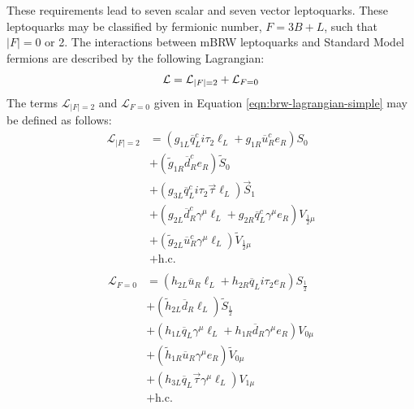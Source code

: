 These requirements lead to seven scalar and seven vector leptoquarks.
These leptoquarks may be classified by fermionic number, $F = 3B + L$, such that $|F| = 0$ or 2.
The interactions between mBRW leptoquarks and Standard Model fermions 
are described by the following Lagrangian:
\begin{equation}
  \mathcal{L} = \mathcal{L}_{|F|=2} + \mathcal{L}_{F=0} \\
  \label{eqn:brw-lagrangian-simple}
\end{equation}
\noindent The terms $\mathcal{L}_{|F|=2}$ and $\mathcal{L}_{F=0}$ given in 
Equation \ref{eqn:brw-lagrangian-simple} may be defined as follows:
\begin{equation}
  \begin{aligned}
    \mathcal{L}_{|F|=2} 
    &= ( g_{1L} \overline{q}_{L}^{c} i \tau_2 \ell_{L} + g_{1R}\overline{u}_{R}^{c} e_{R}) S_{0} \\
    &+ ( \tilde{g}_{1R} \overline{d}^{c}_{R} e_{R} ) \tilde{S}_{0} \\
    &+ ( g_{3L} \overline{q}_{L}^{c} i \tau_2 \vec{\tau} \ell_{L} ) \vec{S}_{1} \\
    &+ ( g_{2L} \overline{d}_{R}^{c} \gamma ^{\mu} \ell_{L} + g_{2R} \overline{q}_{L}^{c} \gamma^{\mu} e_{R} ) V_{\frac{1}{2}\mu} \\
    &+ ( \tilde{g}_{2L} \overline{u}_{R}^{c} \gamma^{\mu} \ell_{L})\tilde{V}_{\frac{1}{2}\mu} \\ 
    &+ \text{h.c.} \\
  \end{aligned}
  \label{eqn:brw-lagrangian-f2}
\end{equation}
\begin{equation}
  \begin{aligned}
    \mathcal{L}_{F=0} 
    &= (h_{2L} \overline{u}_{R} \ell_{L} + h_{2R} \overline{q}_{L} i \tau_{2} e_{R}) S_{\frac{1}{2}} \\
    &+ (\tilde{h}_{2L} \overline{d}_{R} \ell_{L}) \tilde{S}_{\frac{1}{2}} \\
    &+ (h_{1L} \overline{q}_{L} \gamma^{\mu} \ell_{L} + h_{1R} \overline{d}_{R} \gamma^{\mu} e_{R}) V_{0\mu} \\
    &+ (\tilde{h}_{1R} \overline{u}_{R} \gamma^{\mu} e_{R}) \tilde{V}_{0\mu} \\
    &+ (h_{3L} \overline{q}_{L} \vec{\tau}\gamma^{\mu}\ell_{L} ) V_{1\mu} \\ 
    &+ \text{h.c.}
  \end{aligned}
  \label{eqn:brw-lagrangian-f0}
\end{equation}
